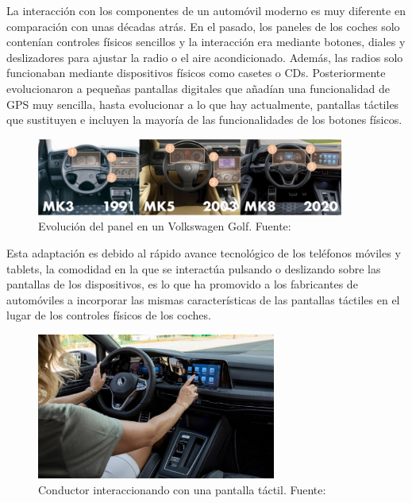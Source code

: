 \documentclass[12pt]{report} %
\begin{document}
La interacción con los componentes de un automóvil moderno es muy diferente en comparación con unas décadas atrás. En el pasado, los paneles de los coches solo contenían controles físicos sencillos y la interacción era mediante botones, diales y deslizadores para ajustar la radio o el aire acondicionado. Además, las radios solo funcionaban mediante dispositivos físicos como casetes o CDs. Posteriormente evolucionaron a pequeñas pantallas digitales que añadían una funcionalidad de GPS muy sencilla, hasta evolucionar a lo que hay actualmente, pantallas táctiles que sustituyen e incluyen la mayoría de las funcionalidades de los botones físicos.
\cite{touchScreen}

\begin{figure}[h]
    \centering
    \includegraphics[width=0.9\textwidth]{evolutionTouchscreen.png}
    \caption{Evolución del panel en un Volkswagen Golf. Fuente: \cite{userExperience}}
    \label{fig:imagen1}
\end{figure}

Esta adaptación es debido al rápido avance tecnológico de los teléfonos móviles y tablets, la comodidad en la que se interactúa pulsando o deslizando sobre las pantallas de los dispositivos, es lo que ha promovido a los fabricantes de automóviles a incorporar las mismas características de las pantallas táctiles en el lugar de los controles físicos de los coches.  

\begin{figure}[h]
    \centering
    \includegraphics[width=0.7\textwidth]{usingTouchscreen.png}
    \caption{Conductor interaccionando con una pantalla táctil. Fuente: \cite{userExperience}}
    \label{fig:imagen2}
\end{figure}
\end{document}
